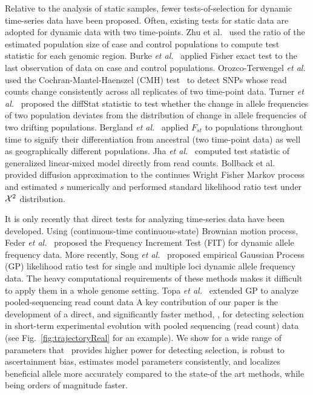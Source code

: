 Relative to the analysis of static samples, fewer tests-of-selection
for dynamic time-series data have been proposed. Often, existing tests
for static data are adopted for dynamic data with two time-points. Zhu
et al.~\cite{zhou2011experimental} used the ratio of the estimated
population size of case and control populations to compute test
statistic for each genomic region. Burke \emph{et
  al.}~\cite{burke2010genome} applied Fisher exact test to the last
observation of data on case and control populations.  Orozco-Terwengel
\emph{et al.}~\cite{orozco2012adaptation} used the
Cochran-Mantel-Haenszel (CMH) test~\cite{agresti2011categorical} to
detect SNPs whose read counts change consistently across all
replicates of two time-point data.  Turner \emph{et
  al.}~\cite{turner2011population} proposed the diffStat statistic to
test whether the change in allele frequencies of two population
deviates from the distribution of change in allele frequencies of two
drifting populations.  Bergland \emph{et
  al.}~\cite{bergland2014genomic} applied $F_{st}$ to populations
throughout time to signify their differentiation from ancestral (two
time-point data) as well as geographically different populations. Jha
\emph{et al.}~\cite{jha2015whole} computed test statistic of
generalized linear-mixed model directly from read counts.  Bollback et
al.~\cite{bollback2008estimation} provided diffusion approximation to
the continues Wright Fisher Markov process and estimated $s$
numerically and performed standard likelihood ratio test under ${\cal X}^2$
distribution.

It is only recently that direct tests for analyzing time-series data
have been developed. Using (continuous-time continuous-state) Brownian
motion process, Feder \emph{et al.}~\cite{feder2014Identifying}
proposed the Frequency Increment Test (FIT) for dynamic allele
frequency data. More recently, Song \emph{et
  al.}~\cite{Terhorst2015Multi} proposed empirical Gaussian Process
(GP) likelihood ratio test for single and multiple loci dynamic allele
frequency data. The heavy computational requirements of these methods
makes it difficult to apply them in a whole genome setting.  
Topa \emph{et al.}~\cite{topa2015gaussian} extended GP to analyze 
pooled-sequencing
read count data
A key
contribution of our paper is the development of a direct, and
significantly faster method, \comale, for detecting selection in
short-term experimental evolution with pooled sequencing (read count)
data (see Fig.~\ref{fig:trajectoryReal} for an example).  We show for a wide 
range of parameters that \comale\ provides
higher power for detecting selection, is robust to ascertainment bias,
estimates model parameters consistently, and localizes beneficial
allele more accurately compared to the state-of the art methods, while
being orders of magnitude faster.
